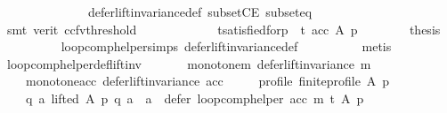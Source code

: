 \begin{isabellebody}
\ \ \ \ \ \ \ \ \ \ \ \ \ \ defer{\isacharunderscore}{\kern0pt}lift{\isacharunderscore}{\kern0pt}invariance{\isacharunderscore}{\kern0pt}def\ subsetCE\ subset{\isacharunderscore}{\kern0pt}eq\isanewline
\ \ \ \ \ \ \ \ \isamarkupfalse%
\ {\isacharparenleft}{\kern0pt}smt\ {\isacharparenleft}{\kern0pt}verit{\isacharcomma}{\kern0pt}\ ccfv{\isacharunderscore}{\kern0pt}threshold{\isacharparenright}{\kern0pt}{\isacharparenright}{\kern0pt}\isanewline
\ \ \ \ \isamarkupfalse%
\isanewline
\ \ \ \ \ \ \isamarkupfalse%
\ t{\isacharunderscore}{\kern0pt}satisfied{\isacharunderscore}{\kern0pt}for{\isacharunderscore}{\kern0pt}p{\isacharcolon}{\kern0pt}\ {\isachardoublequoteopen}{\isasymnot}\ {\isasymnot}t\ {\isacharparenleft}{\kern0pt}acc\ A\ p{\isacharparenright}{\kern0pt}{\isachardoublequoteclose}\isanewline
\ \ \ \ \ \ \isamarkupfalse%
\ {\isacharquery}{\kern0pt}thesis\isanewline
\ \ \ \ \ \ \ \ \isamarkupfalse%
\ loop{\isacharunderscore}{\kern0pt}comp{\isacharunderscore}{\kern0pt}helper{\isachardot}{\kern0pt}simps{\isacharparenleft}{\kern0pt}{}{\isacharparenright}{\kern0pt}\ defer{\isacharunderscore}{\kern0pt}lift{\isacharunderscore}{\kern0pt}invariance{\isacharunderscore}{\kern0pt}def\isanewline
\ \ \ \ \ \ \ \ \isamarkupfalse%
\ metis\isanewline
\ \ \ \ \isamarkupfalse%
\isanewline
\ \ \isamarkupfalse%
\isanewline
{}\isamarkupfalse%
%
\endisatagproof
{\isafoldproof}%
%
\isadelimproof
\isanewline
%
\endisadelimproof
\isanewline
{}\isamarkupfalse%
\ loop{\isacharunderscore}{\kern0pt}comp{\isacharunderscore}{\kern0pt}helper{\isacharunderscore}{\kern0pt}def{\isacharunderscore}{\kern0pt}lift{\isacharunderscore}{\kern0pt}inv{\isacharcolon}{\kern0pt}\isanewline
\ \ \isanewline
\ \ \ \ monotone{\isacharunderscore}{\kern0pt}m{\isacharcolon}{\kern0pt}\ {\isachardoublequoteopen}defer{\isacharunderscore}{\kern0pt}lift{\isacharunderscore}{\kern0pt}invariance\ m{\isachardoublequoteclose}\ \isanewline
\ \ \ \ monotone{\isacharunderscore}{\kern0pt}acc{\isacharcolon}{\kern0pt}\ {\isachardoublequoteopen}defer{\isacharunderscore}{\kern0pt}lift{\isacharunderscore}{\kern0pt}invariance\ acc{\isachardoublequoteclose}\ \isanewline
\ \ \ \ profile{\isacharcolon}{\kern0pt}\ {\isachardoublequoteopen}finite{\isacharunderscore}{\kern0pt}profile\ A\ p{\isachardoublequoteclose}\isanewline
\ \ \isanewline
\ \ \ \ {\isachardoublequoteopen}{\isasymforall}q\ a{\isachardot}{\kern0pt}\ {\isacharparenleft}{\kern0pt}lifted\ A\ p\ q\ a\ {\isasymand}\ a\ {\isasymin}\ {\isacharparenleft}{\kern0pt}defer\ {\isacharparenleft}{\kern0pt}loop{\isacharunderscore}{\kern0pt}comp{\isacharunderscore}{\kern0pt}helper\ acc\ m\ t{\isacharparenright}{\kern0pt}\ A\ p{\isacharparenright}{\kern0pt}{\isacharparenright}{\kern0pt}\ {\isasymlongrightarrow}\isanewline

\end{isabellebody}

